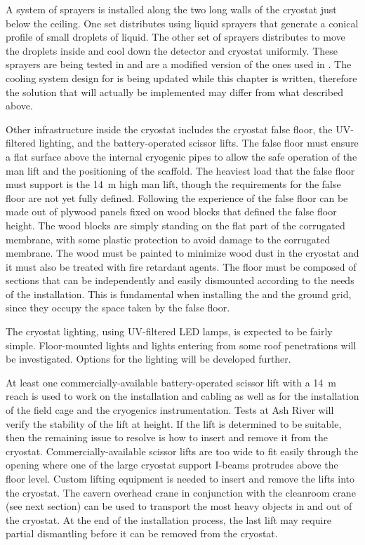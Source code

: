 A system of \cooldown sprayers is installed along the two long walls of the cryostat just below the ceiling.
One set distributes  using liquid sprayers that generate a conical profile of small droplets of liquid.
The other set of sprayers distributes  to move the  droplets inside and cool down the detector and cryostat uniformly.
These sprayers are being tested in  and are a modified version of the ones used in .
The cooling system design for  is being updated while this chapter is written, therefore the solution that will actually be implemented may differ from what described above.


Other infrastructure inside the cryostat includes the cryostat false floor, the UV-filtered lighting, and the battery-operated scissor lifts.
The false floor must ensure a flat surface above the internal cryogenic pipes to allow the safe operation of the man lift and the positioning of the scaffold.
The heaviest load that the false floor must support is the 14~m high man lift, though the requirements for the false floor are not yet fully defined.
Following the experience of  the false floor can be made out of plywood panels fixed on wood blocks that defined the false floor height.
The wood blocks are simply standing on the flat part of the corrugated membrane, with some plastic protection to avoid damage to the corrugated membrane.
The wood must be painted to minimize wood dust in the cryostat and it must also be treated with fire retardant agents.
The floor must be composed of sections that can be independently and easily dismounted according to the needs of the installation.
This is fundamental when installing the  and the ground grid, since they occupy the space taken by the false floor.

The cryostat lighting, using UV-filtered LED lamps, is expected to be fairly simple.
Floor-mounted lights and lights entering from some roof penetrations will be investigated.
Options for the lighting will be developed further.

At least one commercially-available battery-operated scissor lift with a 14~m reach is used to work on the  installation and cabling as well as for the installation of the field cage and the cryogenics instrumentation.
Tests at Ash River will verify the stability of the lift at height.
If the lift is determined to be suitable, then the remaining issue to resolve is how to insert and remove it from the cryostat.
Commercially-available scissor lifts are too wide to fit easily through the  opening where one of the large cryostat support I-beams protrudes above the floor level.
Custom lifting equipment is needed to insert and remove the lifts into the cryostat.
The cavern overhead crane in conjunction with the cleanroom crane (see next section) can be used to transport the most heavy objects in and out of the cryostat.
At the end of the installation process, the last lift may require partial dismantling before it can be removed from the cryostat.

